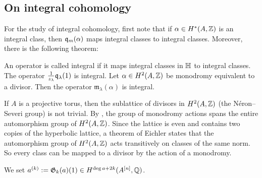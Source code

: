 \subsection{On integral cohomology}

For the study of integral cohomology, first note that if $\alpha \in H^*(A,\mathbb{Z})$ is an integral class, then $\mathfrak{q}_{m}(\alpha) $ maps integral classes to integral classes. 
Moreover, there is the following theorem:
\begin{theorem} \cite{QinWang}
An operator is called integral if it maps integral classes in $\mathbb{H}$ to integral classes. The operator $\frac{1}{z_\lambda}\mathfrak{q}_{\lambda}(1)$ is integral. Let $\alpha \in H^2(A,\mathbb{Z})$ be monodromy equivalent to a divisor. Then the operator $\mathfrak{m}_{\lambda}(\alpha)$ is integral.
\end{theorem}


\begin{remark}
If $A$ is a projective torus, then the sublattice of divisors in $H^2(A,\mathbb{Z})$ (the N\'eron--Severi group) is not trivial. By \cite[Thm.~II]{Shioda}, the group of monodromy actions spans the entire automorphism group of $H^2(A,\mathbb{Z})$.
Since the lattice is even and contains two copies of the hyperbolic lattice, a theorem of Eichler \cite[Prop.~3.7.3]{Scattone} states that the automorphism group of $H^2(A,\mathbb{Z})$ acts transitively on classes of the same norm. So every class can be mapped to a divisor by the action of a monodromy.
\end{remark}

We set $a^{(k)} := \mathfrak{G}_k(a) (1) \in H^{\deg a + 2k}(A^{[n]},\mathbb{Q})$.

